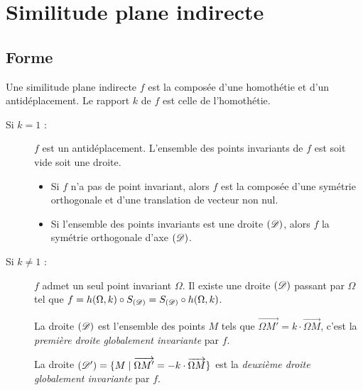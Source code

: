       \section{Similitude plane indirecte}
      \subsection{Forme}
      Une similitude plane indirecte $f$ est la compos\'ee d'une homoth\'etie et d'un antid\'eplacement.
      Le rapport $k$ de $f$ est celle de l'homoth\'etie.
      \begin{description}
            \item[Si $k=1$ :] $f$ est un antid\'eplacement.
                  L'ensemble des points invariants de $f$ est soit vide soit une droite.
                  \begin{itemize}
                        \item Si $f$ n'a pas de point invariant, alors $f$ est la compos\'ee d'une sym\'etrie
                              orthogonale et d'une translation de vecteur non nul.
                        \item Si l'ensemble des points invariants est une droite $(\mathscr{D})$, alors 
                              $f$ la sym\'etrie orthogonale d'axe $(\mathscr{D})$.
                  \end{itemize}
            \item[Si $k\neq 1$ :] $f$ admet un seul point invariant $\Omega$.
                  Il existe une droite $(\mathscr{D})$ passant par $\Omega$ tel que 
                  $f = h(\Omega,k) \circ S_{(\mathscr{D})} = S_{(\mathscr{D})} \circ h(\Omega,k)$.
                  
                  La droite $(\mathscr{D})$ est l'ensemble des points $M$ tels que 
                  $\overrightarrow{\Omega M'} = k \cdot \overrightarrow{\Omega M}$,
                  c'est la \emph{premi\`ere droite globalement invariante} par $f$.
                  
                  La droite $(\mathscr{D}') = \{ M \mid \overrightarrow{\Omega M'} = -k \cdot \overrightarrow{\Omega M} \}$
                  est la \emph{deuxi\`eme droite globalement invariante} par $f$.
      \end{description}
